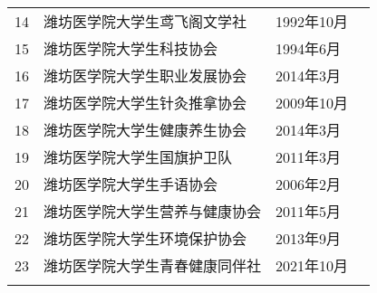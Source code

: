 \begin{table}[H]
\begin{tabular}{|>{\centering\arraybackslash}p{2em}|>{\centering\arraybackslash}p{21em}|%
        >{\centering\arraybackslash}p{6em}|>{\centering\arraybackslash}p{5em}|}
        \cline{1-3}
        14 & 潍坊医学院大学生鸢飞阁文学社        & 1992年10月 &                        \\
        \Xhline{1.2pt}
        15 & 潍坊医学院大学生科技协会          & 1994年6月  & \multirow{2}{*}{创新创业类} \\
        \cline{1-3}
        16 & 潍坊医学院大学生职业发展协会        & 2014年3月  &                        \\
        \Xhline{1.2pt}
        17 & 潍坊医学院大学生针灸推拿协会        & 2009年10月 & \multirow{7}{*}{自律互助类} \\
        \cline{1-3}
        18 & 潍坊医学院大学生健康养生协会        & 2014年3月  &                        \\
        \cline{1-3}
        19 & 潍坊医学院大学生国旗护卫队         & 2011年3月  &                        \\
        \cline{1-3}
        20 & 潍坊医学院大学生手语协会          & 2006年2月  &                        \\
        \cline{1-3}
        21 & 潍坊医学院大学生营养与健康协会       & 2011年5月  &                        \\
        \cline{1-3}
        22 & 潍坊医学院大学生环境保护协会        & 2013年9月  &                        \\
        \cline{1-3}
        23 & 潍坊医学院大学生青春健康同伴社       & 2021年10月 &                        \\
        \Xhline{1.2pt}
    \end{tabular}
\end{table}

